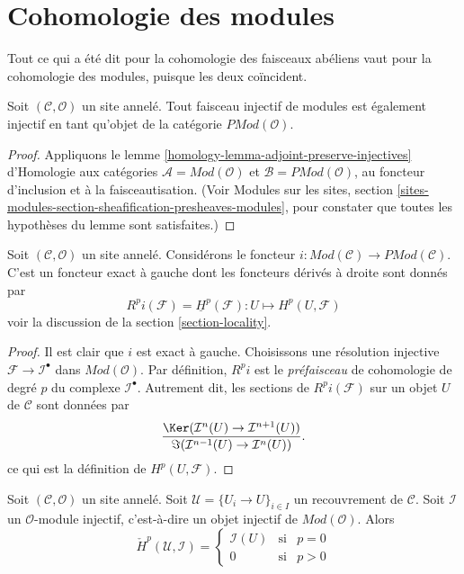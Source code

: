 \section{Cohomologie des modules}
\label{section-cohomology-modules}

\noindent
Tout ce qui a été dit pour la cohomologie des faisceaux abéliens vaut pour la
cohomologie des modules, puisque les deux coïncident.

\begin{lemma}
\label{lemma-injective-module-injective-presheaf}
Soit $(\mathcal{C}, \mathcal{O})$ un site annelé.
Tout faisceau injectif de modules est également injectif en tant qu'objet de
la catégorie $\textit{PMod}(\mathcal{O})$.
\end{lemma}

\begin{proof}
Appliquons le lemme \ref{homology-lemma-adjoint-preserve-injectives}
d'Homologie aux catégories $\mathcal{A} = \textit{Mod}(\mathcal{O})$ et
$\mathcal{B} = \textit{PMod}(\mathcal{O})$, au foncteur d'inclusion et à la
faisceautisation. (Voir Modules sur les sites, section
\ref{sites-modules-section-sheafification-presheaves-modules}, pour constater
que toutes les hypothèses du lemme sont satisfaites.)
\end{proof}

\begin{lemma}
\label{lemma-include-modules}
Soit $(\mathcal{C}, \mathcal{O})$ un site annelé.
Considérons le foncteur
$i : \textit{Mod}(\mathcal{C}) \to \textit{PMod}(\mathcal{C})$.
C'est un foncteur exact à gauche dont les foncteurs dérivés à droite sont
donnés par
$$
R^pi(\mathcal{F}) = \underline{H}^p(\mathcal{F}) :
U \longmapsto H^p(U, \mathcal{F})
$$
voir la discussion de la section \ref{section-locality}.
\end{lemma}

\begin{proof}
Il est clair que $i$ est exact à gauche.
Choisissons une résolution injective $\mathcal{F} \to \mathcal{I}^\bullet$
dans $\textit{Mod}(\mathcal{O})$.
Par définition, $R^pi$ est le {\it préfaisceau} de cohomologie de degré $p$
du complexe $\mathcal{I}^\bullet$. Autrement dit, les sections de
$R^pi(\mathcal{F})$ sur un objet $U$ de $\mathcal{C}$ sont données par
$$
\frac{\Ker(\mathcal{I}^n(U) \to \mathcal{I}^{n + 1}(U))}
{\Im(\mathcal{I}^{n - 1}(U) \to \mathcal{I}^n(U))}.
$$
ce qui est la définition de $H^p(U, \mathcal{F})$.
\end{proof}

\begin{lemma}
\label{lemma-injective-module-trivial-cech}
Soit $(\mathcal{C}, \mathcal{O})$ un site annelé.
Soit $\mathcal{U} = \{U_i \to U\}_{i \in I}$ un recouvrement de
$\mathcal{C}$. Soit $\mathcal{I}$ un $\mathcal{O}$-module injectif,
c'est-à-dire un objet injectif de $\textit{Mod}(\mathcal{O})$. Alors
$$
\check{H}^p(\mathcal{U}, \mathcal{I}) =
\left\{
\begin{matrix}
\mathcal{I}(U) & \text{si} & p = 0 \\
0 & \text{si} & p > 0
\end{matrix}
\right.
$$
\end{lemma}

